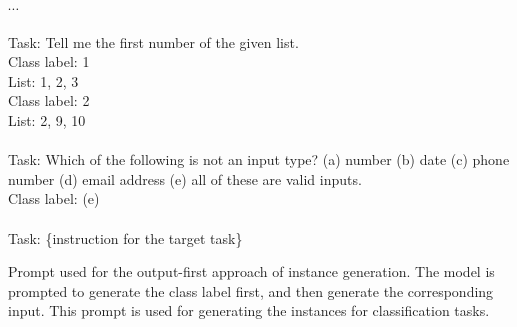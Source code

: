 \begin{table*}[]
{\begin{minipage}{\dimexpr\linewidth-2\fboxsep-2\fboxrule}
$\cdots$ \\
\\
Task: Tell me the first number of the given list.\\
Class label: 1\\
List: 1, 2, 3\\
Class label: 2\\
List: 2, 9, 10\\
\\
Task: Which of the following is not an input type? (a) number (b) date (c) phone number (d) email address (e) all of these are valid inputs.\\
Class label: (e)\\
\\
Task: \{instruction for the target task\}
\end{minipage}
}

    \caption{Prompt used for the output-first approach of instance generation. The model is prompted to generate the class label first, and then generate the corresponding input. This prompt is used for generating the instances for classification tasks.}
    \label{tab:output-first-generation-template}
\end{table*}